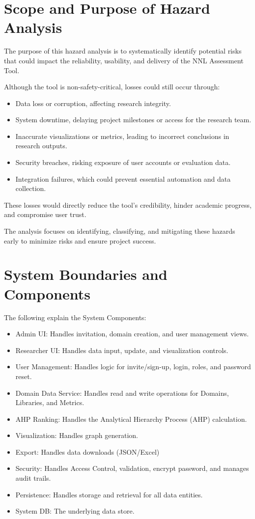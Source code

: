 \documentclass{article}
\begin{document}
\section{Scope and Purpose of Hazard Analysis}

The purpose of this hazard analysis is to systematically identify potential
risks that could impact the reliability, usability, and delivery of the NNL
Assessment Tool.

Although the tool is non-safety-critical, losses could still occur through:

\begin{itemize}
    \item Data loss or corruption, affecting research integrity.
    \item System downtime, delaying project milestones or access for the research team.
    \item Inaccurate visualizations or metrics, leading to incorrect conclusions in research outputs.
    \item Security breaches, risking exposure of user accounts or evaluation data.
    \item Integration failures, which could prevent essential automation and data collection.
\end{itemize}

These losses would directly reduce the tool’s credibility, hinder academic
progress, and compromise user trust.

The analysis focuses on identifying, classifying, and mitigating these hazards
early to minimize risks and ensure project success.

\section{System Boundaries and Components}

The following explain the System Components:
\begin{itemize}
    \item Admin UI: Handles invitation, domain creation, and user management views.
    \item Researcher UI: Handles data input, update, and visualization controls.
    \item User Management: Handles logic for invite/sign-up, login, roles, and password reset.
    \item Domain Data Service: Handles read and write operations for Domains, Libraries, and Metrics.
    \item AHP Ranking: Handles the Analytical Hierarchy Process (AHP) calculation.
    \item Visualization: Handles graph generation.
    \item Export: Handles data downloads (JSON/Excel)
    \item Security: Handles Access Control, validation, encrypt password, and manages audit trails.
    \item Persistence: Handles storage and retrieval for all data entities.
    \item System DB: The underlying data store.
\end{itemize}
\end{document}
